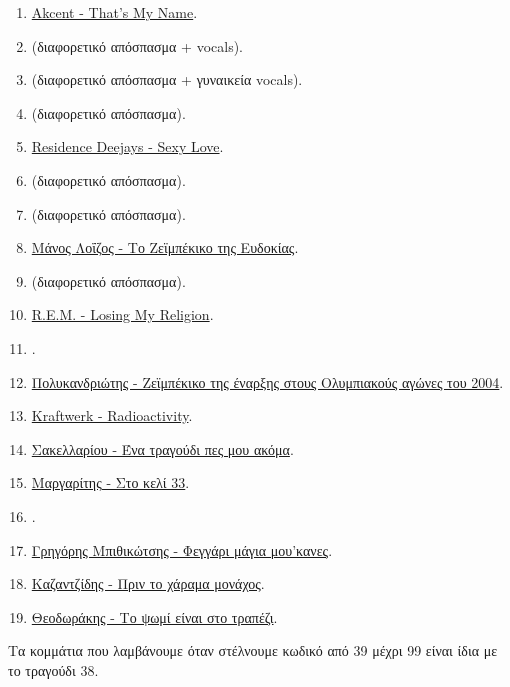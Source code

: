 \begin{enumerate}
\item \href{https://www.youtube.com/watch?v=oASZG96v0Rk}{Akcent - That's My Name}.\label{song:19}
\item {} (διαφορετικό απόσπασμα + vocals).\label{song:20}
\item {} (διαφορετικό απόσπασμα + γυναικεία vocals).\label{song:21}
\item {} (διαφορετικό απόσπασμα).\label{song:22}
\item \href{https://www.youtube.com/watch?v=tuXOTlYOSEA}{Residence Deejays - Sexy Love}.\label{song:23}
\item {} (διαφορετικό απόσπασμα).\label{song:24}
\item {} (διαφορετικό απόσπασμα).\label{song:25}
\item \href{https://www.youtube.com/watch?v=93EiXRdODow}{Μάνος Λοΐζος - Το Ζεϊμπέκικο της Ευδοκίας}.\label{song:26}
\item {} (διαφορετικό απόσπασμα).\label{song:27}
\item \href{https://www.youtube.com/watch?v=xwtdhWltSIg}{R.E.M. - Losing My Religion}.\label{song:28}
\item {}.\label{song:29}
\item \href{https://www.youtube.com/watch?v=Zfla6ZScIsI}{Πολυκανδριώτης - Ζεϊμπέκικο της έναρξης στους Ολυμπιακούς αγώνες του 2004}.\label{song:30}
\item \href{https://www.youtube.com/watch?v=eaScyfSHc-Y}{Kraftwerk - Radioactivity}.\label{song:31}
\item \href{https://www.youtube.com/watch?v=voS5bT5u6s8}{Σακελλαρίου - Ένα τραγούδι πες μου ακόμα}.\label{song:32}
\item \href{https://www.youtube.com/watch?v=OPSPCUk-vLU}{Μαργαρίτης - Στο κελί 33}.\label{song:33}
\item {}.\label{song:34}
\item \href{https://www.youtube.com/watch?v=7IClj68eFeM}{Γρηγόρης Μπιθικώτσης - Φεγγάρι μάγια μου'κανες}.\label{song:35}
\item \href{https://www.youtube.com/watch?v=Pt3zKfq9UFw}{Καζαντζίδης - Πριν το χάραμα μονάχος}.\label{song:36}
\item \href{https://www.youtube.com/watch?v=fYAC5Ngvt2I}{Θεοδωράκης - Το ψωμί είναι στο τραπέζι}.\label{song:37}
\end{enumerate}
Τα κομμάτια που λαμβάνουμε όταν στέλνουμε κωδικό από 39 μέχρι 99 είναι ίδια με το τραγούδι 38.
